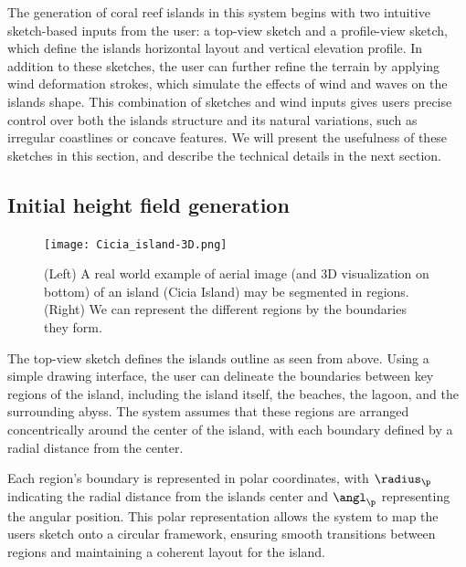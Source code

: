 
The generation of coral reef islands in this system begins with two intuitive sketch-based inputs from the user: a top-view sketch and a profile-view sketch, which define the islands horizontal layout and vertical elevation profile. In addition to these sketches, the user can further refine the terrain by applying wind deformation strokes, which simulate the effects of wind and waves on the islands shape. This combination of sketches and wind inputs gives users precise control over both the islands structure and its natural variations, such as irregular coastlines or concave features. We will present the usefulness of these sketches in this section, and describe the technical details in the next section.

\subsection{Initial height field generation}
\label{sec:coral-island_generation-initial}


\begin{figure}[H]
	\centering
	\texttt{[image: Cicia\_island-3D.png]}
    \caption{(Left) A real world example of aerial image (and 3D visualization on bottom) of an island (Cicia Island) may be segmented in regions. (Right) We can represent the different regions by the boundaries they form.}
    \label{fig:coral-island_top-view-sketch}
\end{figure}

The top-view sketch defines the islands outline as seen from above. Using a simple drawing interface, the user can delineate the boundaries between key regions of the island, including the island itself, the beaches, the lagoon, and the surrounding abyss. The system assumes that these regions are arranged concentrically around the center of the island, with each boundary defined by a radial distance from the center.

Each region's boundary is represented in polar coordinates, with $\radius_\p$ indicating the radial distance from the islands center and $\angl_\p$ representing the angular position. This polar representation allows the system to map the users sketch onto a circular framework, ensuring smooth transitions between regions and maintaining a coherent layout for the island.

